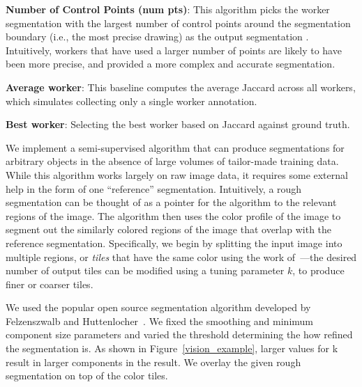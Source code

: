 \par \noindent\textbf{Number of Control Points (num pts)}: This algorithm picks the worker segmentation with the largest number of control points around the segmentation boundary (i.e., the most precise drawing) as the output segmentation \cite{Vittayakorn2011,Sorokin2008}. Intuitively, workers that have used a larger number of points are likely to have been more precise, and provided a more complex and accurate segmentation. 
\par \noindent\textbf{Average worker}: This baseline computes the average Jaccard across all workers, which simulates collecting only a single worker annotation.
\par \noindent\textbf{Best worker}: Selecting the best worker based on Jaccard against ground truth. 


\par We implement a semi-supervised algorithm that can produce segmentations for arbitrary objects in the absence of large volumes of tailor-made training data. While this algorithm works largely on raw image data, it requires some external help in the form of one ``reference'' segmentation. Intuitively, a rough segmentation can be thought of as a pointer for the algorithm to the relevant regions of the image. The algorithm then uses the color profile of the image to segment out the similarly colored regions of the image that overlap with the reference segmentation. Specifically, we begin by splitting the input image into multiple regions, or {\em tiles} that have the same color using the work of~\cite{felzenszwalb2004efficient}---the desired number of output tiles can be modified using a tuning parameter $k$, to produce finer or coarser tiles.

We used the popular open source segmentation algorithm developed by Felzenszwalb and Huttenlocher~\cite{felzenszwalb2004efficient}. We fixed the smoothing and minimum component size parameters and varied the threshold determining the how refined the segmentation is. As shown in Figure~\ref{vision_example}, larger values for k result in larger components in the result. We overlay the given rough segmentation on top of the color tiles.

